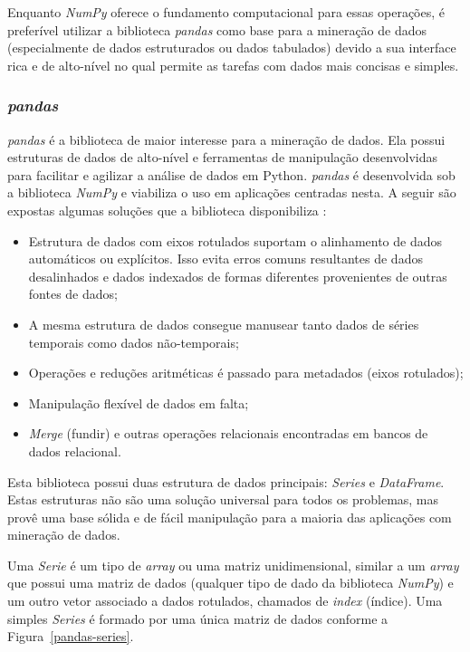 Enquanto \textit{NumPy} oferece o fundamento computacional para essas operações, é preferível utilizar a biblioteca \textit{pandas} como base para a mineração de dados (especialmente de dados estruturados ou dados tabulados) devido a sua interface rica e de alto-nível no qual permite as tarefas com dados mais concisas e simples.

\subsubsection{\textbf{\textit{pandas}}}
\textit{pandas} é a biblioteca de maior interesse para a mineração de dados. Ela possui estruturas de dados de alto-nível e ferramentas de manipulação desenvolvidas para facilitar e agilizar a análise de dados em Python. \textit{pandas} é desenvolvida sob a biblioteca \textit{NumPy} e viabiliza o uso em aplicações centradas nesta. A seguir são expostas algumas soluções que a biblioteca disponibiliza \cite{python-analysis}:

\begin{itemize}
    \item Estrutura de dados com eixos rotulados suportam o alinhamento de dados automáticos ou explícitos. Isso evita erros comuns resultantes de dados desalinhados e dados indexados de formas diferentes provenientes de outras fontes de dados;
    \item A mesma estrutura de dados consegue manusear tanto dados de séries temporais como dados não-temporais;
    \item Operações e reduções aritméticas é passado para metadados (eixos rotulados);
    \item Manipulação flexível de dados em falta;
    \item \textit{Merge} (fundir) e outras operações relacionais encontradas em bancos de dados relacional.
\end{itemize}

Esta biblioteca possui duas estrutura de dados principais: \textit{Series} e \textit{DataFrame}. Estas estruturas não são uma solução universal para todos os problemas, mas provê uma base sólida e de fácil manipulação para a maioria das aplicações com mineração de dados.

Uma \textit{Serie} é um tipo de \textit{array} ou uma matriz unidimensional, similar a um \textit{array} que possui uma matriz de dados (qualquer tipo de dado da biblioteca \textit{NumPy}) e um outro vetor associado a dados rotulados, chamados de \textit{index} (índice). Uma simples \textit{Series} é formado por uma única matriz de dados conforme a Figura~\ref{pandas-series}.

